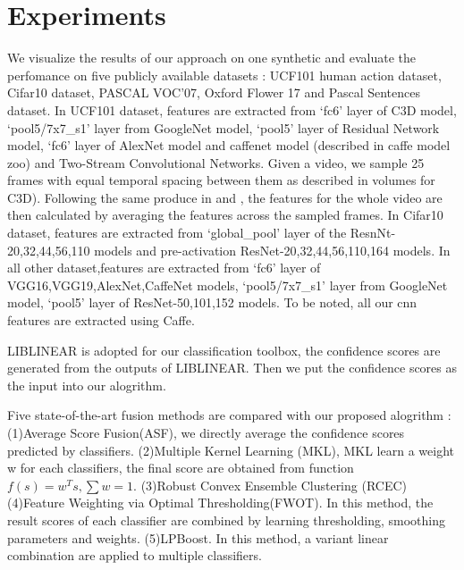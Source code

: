 \documentclass[letterpaper]{article}
\begin{document}
\section{Experiments}
We visualize the results of our approach on one synthetic and evaluate the perfomance on five publicly available datasets : UCF101 human action dataset\cite{soomro2012ucf101}, Cifar10\cite{krizhevsky2009learning} dataset, PASCAL VOC’07\cite{pascal-voc-2007}, Oxford Flower 17\cite{nilsback2006visual} and Pascal Sentences dataset.
In UCF101 dataset, features are extracted from `fc6' layer of C3D model\cite{tran2015learning}, `pool5/7x7\_s1' layer from GoogleNet model\cite{szegedy2015going}, `pool5' layer of Residual Network model\cite{he2015deep}, `fc6' layer of AlexNet\cite{krizhevsky2012imagenet} model\cite{krizhevsky2012imagenet} and caffenet model (described in caffe model zoo) and Two-Stream Convolutional Networks. Given a video, we sample 25 frames with equal temporal spacing between them as described in \cite{simonyan2014two} volumes for C3D). Following the same produce in \cite{tran2015learning} and \cite{simonyan2014two}, the features for the whole video are then calculated by averaging the features across the sampled frames.
In Cifar10 dataset, features are extracted from `global\_pool' layer of the ResnNt-20,32,44,56,110 models\cite{he2015deep} and pre-activation ResNet-20,32,44,56,110,164 models\cite{he2016identity}.
In all other dataset,features are extracted from `fc6' layer of VGG16,VGG19\cite{chatfield2014return},AlexNet,CaffeNet models, `pool5/7x7\_s1' layer from GoogleNet model\cite{szegedy2015going}, `pool5' layer of ResNet-50,101,152 models.
To be noted, all our cnn features are extracted using Caffe\cite{jia2014caffe}.

LIBLINEAR\cite{fan2008liblinear} is adopted for our classification toolbox, the confidence scores are generated from the outputs of LIBLINEAR. Then we put the confidence scores as the input into our alogrithm.

Five state-of-the-art fusion methods are compared with our proposed alogrithm : (1)Average Score Fusion(ASF), we directly average the confidence scores predicted by classifiers. (2)Multiple Kernel Learning (MKL),  MKL learn a weight w for each classifiers, the final score are obtained from function $f(s)=w^{T}s, \sum w = 1$. (3)Robust Convex Ensemble Clustering (RCEC)\cite{gaoijcai2016robust} (4)Feature Weighting via Optimal Thresholding(FWOT)\cite{xuiccv2013feature}. In this method, the result scores of each classifier are combined by learning thresholding, smoothing parameters and weights. (5)LPBoost\cite{gehler2009feature}. In this method, a variant linear combination are applied to multiple classifiers.
\end{document}
